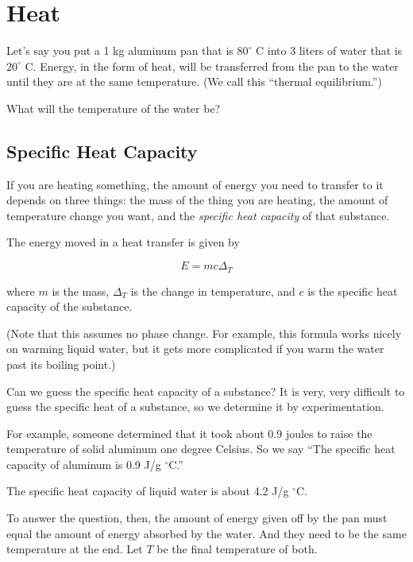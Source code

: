 \chapter{Heat}

Let's say you put a 1 kg aluminum pan that is $80^\circ$ C into
3 liters of water that is $20^\circ$ C. Energy, in the form of heat,
will be transferred from the pan to the water until they are at the same
temperature. (We call this ``thermal equilibrium.'')

What will the temperature of the water be?

\section{Specific Heat Capacity}

If you are heating something, the amount of energy you need to
transfer to it depends on three things: the mass of the thing you are
heating, the amount of temperature change you want, and the
\textit{specific heat capacity} of that substance.

\begin{mdframed}[style=important, frametitle={Energy in Heat Transfer}]

  The energy moved in a heat transfer is given by

  $$E = m c \Delta_T$$

  where $m$ is the mass, $\Delta_T$ is the change in temperature, and
  $c$ is the specific heat capacity of the substance.

  (Note that this
  assumes no phase change. For example, this formula works nicely on
  warming liquid water, but it gets more complicated if you warm the
  water past its boiling point.)

\end{mdframed}

Can we guess the specific heat capacity of a substance? It is very,
very difficult to guess the specific heat of a substance, so we determine
it by experimentation.

For example, someone determined that it took about 0.9 joules to raise
the temperature of solid aluminum one degree Celsius. So we say ``The
specific heat capacity of aluminum is 0.9 J/g $^\circ$C.''

The specific heat capacity of liquid water is about 4.2 J/g $^\circ$C.

To answer the question, then, the amount of energy given off by the
pan must equal the amount of energy absorbed by the water. And they
need to be the same temperature at the end.  Let $T$ be the final
temperature of both.

